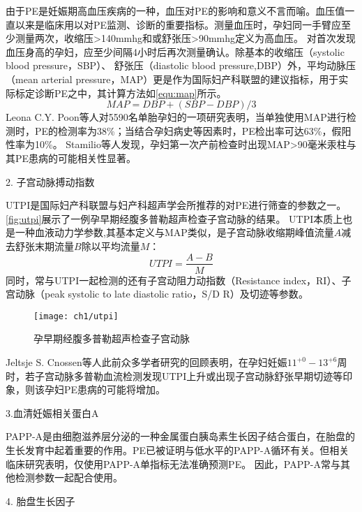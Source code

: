 由于PE是妊娠期高血压疾病的一种\cite{OAG9,HDASOM,2000s1}，血压对PE的影响和意义不言而喻。血压值一直以来是临床用以对PE监测、诊断的重要指标。测量血压时，孕妇同一手臂应至少测量两次，收缩压>140mmhg和或舒张压>90mmhg定义为高血压。
对首次发现血压身高的孕妇，应至少间隔4小时后再次测量确认\cite{OAG9}。除基本的收缩压（systolic blood pressure，SBP）、
舒张压（diastolic blood pressure,DBP）外，平均动脉压（mean arterial pressure，MAP）更是作为国际妇产科联盟的建议指标，用于实际标定诊断PE之中，其计算方法如\autoref{equ:map}所示\cite{FIGO}。
\begin{equation}
    \label{equ:map}
    MAP=DBP+(SBP-DBP)/3
\end{equation}
Leona C.Y. Poon\cite{Poon2008}等人对5590名单胎孕妇的一项研究表明，当单独使用MAP进行检测时，PE的检测率为38\%；当结合孕妇病史等因素时，PE检出率可达63\%，假阳性率为10\%。
Stamilio等人\cite{Stamilio2000}发现，孕妇第一次产前检查时出现MAP>90毫米汞柱与其PE患病的可能相关性显著。

2. 子宫动脉搏动指数

UTPI是国际妇产科联盟与妇产科超声学会所推荐的对PE进行筛查的参数之一\cite{FIGO,Sotiriadis2019}。\autoref{fig:utpi}展示了一例孕早期经腹多普勒超声检查子宫动脉的结果\cite{Sotiriadis2019}。
UTPI本质上也是一种血液动力学参数,其基本定义与MAP类似，是子宫动脉收缩期峰值流量$A$减去舒张末期流量$B$除以平均流量$M$\cite{Cnossen2008}：
\begin{equation}
    \label{equ:utpi}
    UTPI=\frac{A-B}{M}
\end{equation}
同时，常与UTPI一起检测的还有子宫动阻力动指数（Resistance index，RI）、子宫动脉（peak systolic to late diastolic ratio，S/D R）及切迹等参数\cite{Cnossen2008}。
\begin{figure}[htbp]
    \centering
    \texttt{[image: ch1/utpi]}
    \caption{\label{fig:utpi}孕早期经腹多普勒超声检查子宫动脉}
\end{figure}
Jeltsje S. Cnossen等人\cite{Cnossen2008}此前众多学者研究的回顾表明，在孕妇妊娠$11^{+0}-13^{+6}$周时，若子宫动脉多普勒血流检测发现UTPI上升或出现子宫动脉舒张早期切迹等印象，则该孕妇PE患病的可能将增加\cite{OAG9,Plasencia2008}。

3.血清妊娠相关蛋白A

PAPP-A是由细胞滋养层分泌的一种金属蛋白胰岛素生长因子结合蛋白，在胎盘的生长发育中起着重要的作用。PE已被证明与低水平的PAPP-A循环有关\cite{FIGO}。但相关临床研究表明，仅使用PAPP-A单指标无法准确预测PE\cite{Smith2002}。
因此，PAPP-A常与其他检测参数一起配合使用\cite{Poon2009,Tan2018,Ray2018}。 

4. 胎盘生长因子

